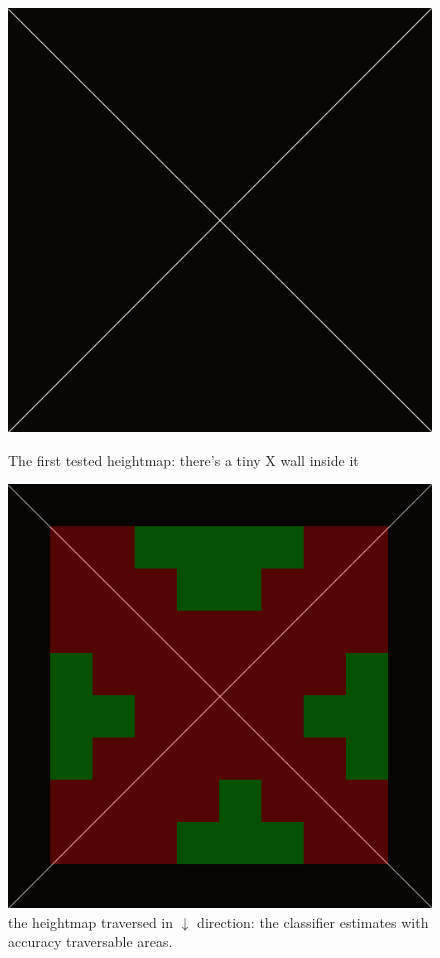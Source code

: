 \documentclass[]{usiinfbachelorproject}
\begin{document}
\begin{figure}[H]
  \includegraphics[width=\linewidth]{x}
    \caption{The first tested heightmap: there's a tiny X wall inside it}\label{fig:x}
\endminipage\hfill
{}
  \includegraphics[width=\linewidth]{x90}
    \caption{the heightmap traversed in $\downarrow$ direction: the classifier estimates with accuracy traversable areas.}\label{fig:x90}
\endminipage\hfill
\end{figure}
\end{document}
